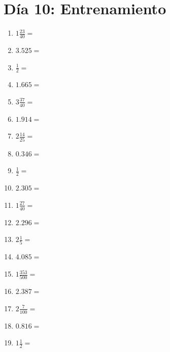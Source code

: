 \documentclass[12pt]{article}
\begin{document}
\section*{Día 10: Entrenamiento}
\begin{enumerate}
\item \large $ 1 \frac{23}{40} = $ \vspace{1.5cm}
\item \large $ 3.525 = $ \vspace{1.5cm}
\item \large $ \frac{1}{2} = $ \vspace{1.5cm}
\item \large $ 1.665 = $ \vspace{1.5cm}
\item \large $ 3 \frac{37}{40} = $ \vspace{1.5cm}
\item \large $ 1.914 = $ \vspace{1.5cm}
\item \large $ 2 \frac{14}{25} = $ \vspace{1.5cm}
\item \large $ 0.346 = $ \vspace{1.5cm}
\item \large $ \frac{1}{2} = $ \vspace{1.5cm}
\item \large $ 2.305 = $ \vspace{1.5cm}
\newpage
\item \large $ 1 \frac{27}{40} = $ \vspace{1.5cm}
\item \large $ 2.296 = $ \vspace{1.5cm}
\item \large $ 2 \frac{1}{5} = $ \vspace{1.5cm}
\item \large $ 4.085 = $ \vspace{1.5cm}
\item \large $ 1 \frac{353}{500} = $ \vspace{1.5cm}
\item \large $ 2.387 = $ \vspace{1.5cm}
\item \large $ 2 \frac{7}{100} = $ \vspace{1.5cm}
\item \large $ 0.816 = $ \vspace{1.5cm}
\item \large $ 1 \frac{1}{2} = $ \vspace{1.5cm}

\end{enumerate}
\end{document}

